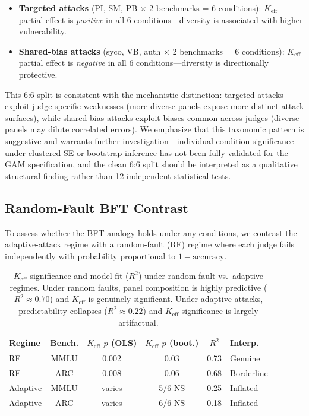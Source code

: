 \documentclass[11pt,a4paper]{article}
\newcommand{\keff}{\ensuremath{K_{\text{eff}}}}
\begin{document}
\begin{itemize}
\item \textbf{Targeted attacks} (PI, SM, PB $\times$ 2 benchmarks = 6 conditions): $\keff$ partial effect is \emph{positive} in all 6 conditions---diversity is associated with higher vulnerability.
\item \textbf{Shared-bias attacks} (syco, VB, auth $\times$ 2 benchmarks = 6 conditions): $\keff$ partial effect is \emph{negative} in all 6 conditions---diversity is directionally protective.
\end{itemize}

This 6:6 split is consistent with the mechanistic distinction: targeted attacks exploit judge-specific weaknesses (more diverse panels expose more distinct attack surfaces), while shared-bias attacks exploit biases common across judges (diverse panels may dilute correlated errors).
We emphasize that this taxonomic pattern is suggestive and warrants further investigation---individual condition significance under clustered SE or bootstrap inference has not been fully validated for the GAM specification, and the clean 6:6 split should be interpreted as a qualitative structural finding rather than 12 independent statistical tests.

\subsection{Random-Fault BFT Contrast}
\label{sec:bft}

To assess whether the BFT analogy holds under any conditions, we contrast the adaptive-attack regime with a random-fault (RF) regime where each judge fails independently with probability proportional to $1 - \text{accuracy}$.

\begin{table}[t]
\centering
\small
\begin{tabular}{lccccl}
\toprule
\textbf{Regime} & \textbf{Bench.} & \textbf{$\keff$ $p$ (OLS)} & \textbf{$\keff$ $p$ (boot.)} & \textbf{$R^2$} & \textbf{Interp.} \\
\midrule
RF & MMLU & 0.002 & 0.03 & 0.73 & Genuine \\
RF & ARC & 0.008 & 0.06 & 0.68 & Borderline \\
Adaptive & MMLU & varies & 5/6 NS & 0.25 & Inflated \\
Adaptive & ARC & varies & 6/6 NS & 0.18 & Inflated \\
\bottomrule
\end{tabular}
\caption{$\keff$ significance and model fit ($R^2$) under random-fault vs.\ adaptive regimes.
Under random faults, panel composition is highly predictive ($R^2\approx 0.70$) and $\keff$ is genuinely significant.
Under adaptive attacks, predictability collapses ($R^2\approx 0.22$) and $\keff$ significance is largely artifactual.}
\label{tab:bft}
\end{table}
\end{document}
